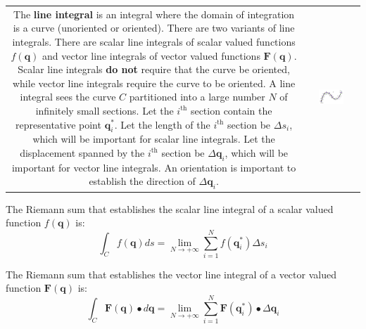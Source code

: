 \documentclass{article}
\begin{document}
\begin{tabular}{cc}
\parbox{0.5\textwidth}{
The {\bf line integral} is an integral where the domain of integration is a curve (unoriented or oriented). There are two variants of line integrals. There are scalar line integrals of scalar valued functions \(f(\mathbf{q})\) and vector line integrals of vector valued functions \(\mathbf{F}(\mathbf{q})\). Scalar line integrals {\bf do not} require that the curve be oriented, while vector line integrals require the curve to be oriented. A line integral sees the curve \(C\) partitioned into a large number \(N\) of infinitely small sections. Let the \(i^{\text{th}}\) section contain the representative point \(\mathbf{q}_i^*\). Let the length of the \(i^{\text{th}}\) section be \(\Delta s_i\), which will be important for scalar line integrals. Let the displacement spanned by the \(i^{\text{th}}\) section be \(\Delta \mathbf{q}_i\), which will be important for vector line integrals. An orientation is important to establish the direction of \(\Delta\mathbf{q}_i\). 
} & \parbox{0.5\textwidth}{
\includegraphics[width = 0.5\textwidth]{line_integral_Riemann_sum}
}
\end{tabular}

The Riemann sum that establishes the scalar line integral of a scalar valued function \(f(\mathbf{q})\) is:
\[\int_C f(\mathbf{q})ds= \lim_{N \rightarrow +\infty} \sum_{i = 1}^N f(\mathbf{q}_i^*) \Delta s_i\]

The Riemann sum that establishes the vector line integral of a vector valued function \(\mathbf{F}(\mathbf{q})\) is:
\[\int_C \mathbf{F}(\mathbf{q}) \bullet d\mathbf{q} = \lim_{N \rightarrow +\infty} \sum_{i = 1}^N \mathbf{F}(\mathbf{q}_i^*) \bullet \Delta \mathbf{q}_i\]
\end{document}
